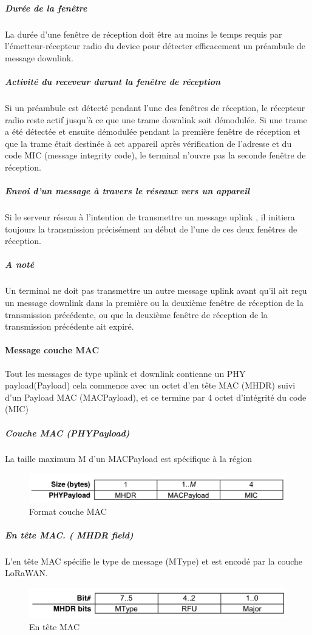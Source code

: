 \documentclass[11pt]{article}
\begin{document}
\subparagraph{Durée de la fenêtre}

La durée d'une fenêtre de réception doit être au moins le temps requis par l'émetteur-récepteur radio du device pour détecter efficacement un préambule de message downlink.

\subparagraph{Activité du receveur durant la fenêtre de réception}

Si un préambule est détecté pendant l'une des fenêtres de réception, le récepteur radio reste actif jusqu'à ce que une trame downlink soit démodulée. Si une trame a été détectée et ensuite démodulée pendant la première fenêtre de réception et que la trame était destinée à cet appareil après vérification de l'adresse et du code MIC (message integrity code), le terminal n'ouvre pas la seconde fenêtre de réception.

\subparagraph{Envoi d'un message à travers le réseaux vers un appareil}

Si le serveur réseau à l'intention de transmettre un message uplink , il initiera toujours la transmission précisément au début de l'une de ces deux fenêtres de réception.
\subparagraph{A noté}

Un terminal ne doit pas transmettre un autre message uplink avant qu'il ait reçu un message downlink dans la première ou la deuxième fenêtre de réception de la transmission précédente, ou que la deuxième fenêtre de réception de la transmission précédente ait expiré.

\paragraph{Message couche MAC }
Tout les messages de type uplink et downlink contienne un PHY payload(Payload) cela commence avec un octet d'en tête MAC (MHDR) suivi d'un Payload MAC (MACPayload), et ce termine par 4 octet d'intégrité du code (MIC)

\subparagraph{Couche MAC (PHYPayload)}
La taille maximum M d'un MACPayload est spécifique à la région 


\begin{figure}[h!]
\centering
\includegraphics[scale=0.6]{A_phyload.png}
\caption{Format couche MAC}
\end{figure}


\newpage
\subparagraph{En tête MAC. ( MHDR field)}
L'en tête MAC spécifie le type de message (MType) et est encodé par la couche LoRaWAN.
\begin{figure}[h!]
\centering
\includegraphics[scale=0.6]{A_mac_header.png}
\caption{En tête MAC}
\end{figure}
\end{document}
